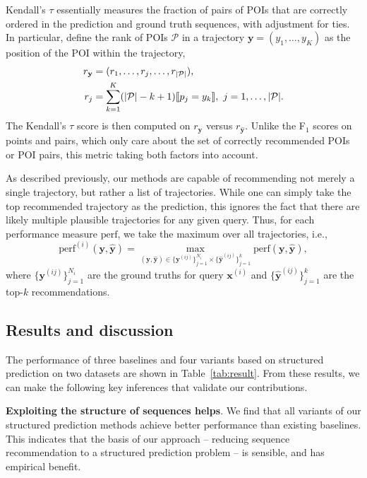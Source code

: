 Kendall's $\tau$
essentially measures the fraction of pairs of POIs that are correctly ordered in the prediction and ground truth sequences,
with adjustment for ties.
In particular,
define the rank of POIs $\mathcal{P}$ in a trajectory $\mathbf{y} = (y_1,\dots,y_K)$ as
the position of the POI within the trajectory,
\begin{align*} 
r_\mathbf{y} &= (r_1,\dots,r_j,\dots,r_{|\mathcal{P}|}), \\
r_j &= \sum_{k=1}^K (| \mathcal{P} | - k + 1)  \llbracket p_j = y_k \rrbracket, ~ j = 1, \dots, | \mathcal{P} |.
\end{align*}
The Kendall's $\tau$ score is then computed on $r_\mathbf{y}$ versus $r_\mathbf{\hat{y}}$.
Unlike the F$_1$ scores on points and pairs, 
which only care about the set of correctly recommended POIs or POI pairs,
this metric taking both factors into account.

As described previously, our methods are capable of recommending not merely a single trajectory,
but rather a list of trajectories.
While one can simply take the top recommended trajectory as the prediction,
this ignores the fact that there are likely multiple plausible trajectories for any given query.
Thus, for each performance measure $\mathrm{perf}$,
we take the maximum over all trajectories,
i.e.,
\begin{equation*}
\mathrm{perf}^{(i)}( \mathbf{y}, \hat{\mathbf{y}} ) =
\max_{(\mathbf{y}, \hat{\mathbf{y}}) \in \{\mathbf{y}^{(ij)}\}_{j=1}^{N_i} \times \{\hat{\mathbf{y}}^{(ij)}\}_{j=1}^k} 
\mathrm{perf}(\mathbf{y}, {\hat{\mathbf{y}}}),
\end{equation*}
where $\{\mathbf{y}^{(ij)}\}_{j=1}^{N_i}$ are the ground truths for query $\mathbf{x}^{(i)}$ and
$\{\hat{\mathbf{y}}^{(ij)}\}_{j=1}^k$ are the top-$k$ recommendations.



%
\subsection{Results and discussion}
\label{sec:result}



The performance of three baselines and four variants based on structured prediction on two datasets are shown in Table~\ref{tab:result}.
From these results, we can make the following key inferences that validate our contributions.

\textbf{Exploiting the structure of sequences helps}.
We find that all variants of our structured prediction methods achieve better performance than existing baselines.
This indicates that the basis of our approach -- reducing sequence recommendation to a structured prediction problem -- is sensible, and has empirical benefit.

